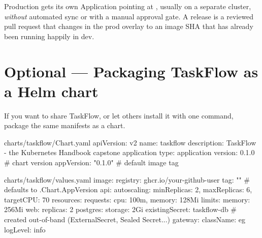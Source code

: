 Production gets its own Application pointing at , usually
on a separate cluster, \emph{without} automated sync or with a manual approval
gate. A release is a reviewed pull request that changes  in the prod
overlay to an image SHA that has already been running happily in dev.

\section{Optional --- Packaging TaskFlow as a Helm chart}

If you want to share TaskFlow, or let others install it with one command,
package the same manifests as a chart.

\begin{yamlcode}{charts/taskflow/Chart.yaml}
apiVersion: v2
name: taskflow
description: TaskFlow - the Kubernetes Handbook capstone application
type: application
version: 0.1.0           # chart version
appVersion: "0.1.0"      # default image tag
\end{yamlcode}

\begin{yamlcode}{charts/taskflow/values.yaml}
image:
  registry: ghcr.io/your-github-user
  tag: ""                # defaults to .Chart.AppVersion
api:
  autoscaling: { minReplicas: 2, maxReplicas: 6, targetCPU: 70 }
  resources:
    requests: { cpu: 100m, memory: 128Mi }
    limits:   { memory: 256Mi }
web:
  replicas: 2
postgres:
  storage: 2Gi
  existingSecret: taskflow-db    # created out-of-band (ExternalSecret, Sealed Secret...)
gateway:
  className: eg
logLevel: info
\end{yamlcode}


